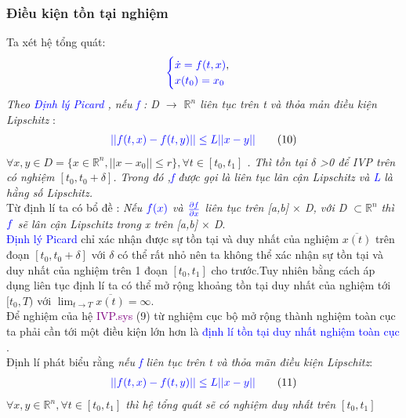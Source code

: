 \documentclass[a4paper]{article}
\begin{document}
    \subsubsection{Điều kiện tồn tại nghiệm}
Ta xét hệ tổng quát: 
\begin{align*}
        \textcolor{blue}{
        \begin{cases}
            \dot x= f(t,x) \textcolor{black}{,}\\
            x(t_0)=x_0
        \end{cases}}
    \end{align*}
    \textit{Theo  \textcolor{blue}{Định lý Picard } , nếu \textcolor{blue}{f} : D $\rightarrow$ $\mathbb{R}^{n}$ liên tục trên t và thỏa mản điều kiện Lipschitz }:  
    \begin{align*}
     \textcolor{blue}{||f(t,x)-f(t,y)||\leq L||x-y||}
     \tag{10}
    \end{align*}
\textit{$\forall x,y \in D=\{x\in\mathbb{R}^{n} ,||x-x_0||\leq r\}, \forall t\in [t_0,t_1]$
   . Thì  tồn tại $\delta$ >0 để IVP trên có nghiệm 
   $[t_0 , t_0 +\delta]$.
   Trong đó ,\textcolor{blue}{f} được gọi là liên tục lân cận Lipschitz và \textcolor{blue}{L} là hằng số Lipschitz.}\\ 
   Từ định lí ta có bổ đề  : \textit{Nếu $\textcolor{blue}{f(x)}$ và $\textcolor{blue}{\frac{\partial f}{\partial x}}$ liên tục trên [a,b]  $\times$ D, với D $\subset  \mathbb{R}^{n}$ thì $\textcolor{blue}{f}$ sẽ lân cận Lipschitz trong x trên [a,b] $\times$ D}.\\
   \textcolor{blue}{Định lý Picard } chỉ xác nhận được sự tồn tại và duy nhất của nghiệm $\overline{x(t)}$ trên đoạn $[t_0,t_0+\delta]$ với $\delta$ có thể rất nhỏ nên ta không thể xác nhận sự tồn tại và duy nhất của nghiệm trên 1 đoạn $[t_0,t_1]$ cho trước.Tuy nhiên bằng cách áp dụng liên tục định lí ta có thể mở rộng khoảng tồn tại duy nhất của nghiệm tới  $[t_0,T)$ với $\lim_{t \to T}\overline{x(t)} =\infty$.\\
    Để nghiệm của hệ \textcolor{purple}{IVP.sys} (9) từ nghiệm cục bộ mở rộng thành nghiệm toàn cục ta phải cần tới một điều kiện lớn hơn là \textcolor{blue}{định lí tồn tại duy nhất nghiệm toàn cục }.
    \\Định lí phát biểu rằng \textit{nếu  \textcolor{blue}{f} liên tục trên t và thỏa mãn điều kiện Lipschitz}:
    \begin{align*}
     \textcolor{blue}{||f(t,x)-f(t,y)||\leq L||x-y||}
     \tag{11}
    \end{align*}
   \textit{ $\forall x,y \in \mathbb{R}^{n}, \forall t\in [t_0,t_1]$ thì hệ tổng quát sẽ có nghiệm duy nhất trên $[t_0,t_1]$}\\
\end{document}
